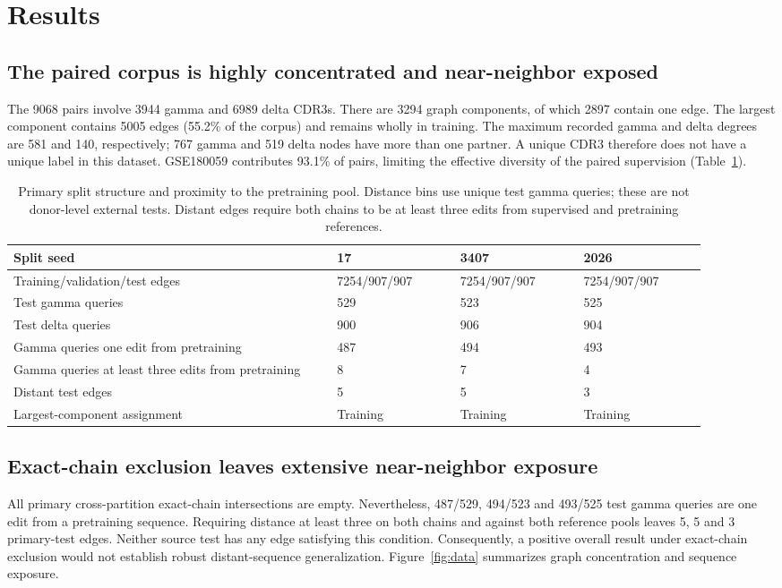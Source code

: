 \documentclass[12pt]{article}
\begin{document}
\section{Results}
\subsection{The paired corpus is highly concentrated and near-neighbor exposed}
The 9068 pairs involve 3944 gamma and 6989 delta CDR3s. There are 3294 graph
components, of which 2897 contain one edge. The largest component contains
5005 edges (55.2\% of the corpus) and remains wholly in training. The maximum
recorded gamma and delta degrees are 581 and 140, respectively; 767 gamma and
519 delta nodes have more than one partner. A unique CDR3 therefore does not
have a unique label in this dataset. GSE180059 contributes 93.1\% of pairs,
limiting the effective diversity of the paired supervision
(Table~\ref{tab:data}).

\begin{table}[!htbp]
\centering
\caption{Primary split structure and proximity to the pretraining pool. Distance bins use unique test gamma queries; these are not donor-level external tests. Distant edges require both chains to be at least three edits from supervised and pretraining references.}
\label{tab:data}
\small
\setlength{\tabcolsep}{3pt}
\begin{tabular}{>{\raggedright\arraybackslash}p{0.4200\linewidth}p{0.1600\linewidth}p{0.1600\linewidth}p{0.1600\linewidth}}
\toprule
Split seed & 17 & 3407 & 2026\\
\midrule
Training/validation/test edges & 7254/907/907 & 7254/907/907 & 7254/907/907\\
Test gamma queries & 529 & 523 & 525\\
Test delta queries & 900 & 906 & 904\\
Gamma queries one edit from pretraining & 487 & 494 & 493\\
Gamma queries at least three edits from pretraining & 8 & 7 & 4\\
Distant test edges & 5 & 5 & 3\\
Largest-component assignment & Training & Training & Training\\
\bottomrule
\end{tabular}
\end{table}

\subsection{Exact-chain exclusion leaves extensive near-neighbor exposure}
All primary cross-partition exact-chain intersections are empty. Nevertheless,
487/529, 494/523 and 493/525 test gamma queries are one edit from a pretraining
sequence. Requiring distance at least three on both chains and against both
reference pools leaves 5, 5 and 3 primary-test edges. Neither source test has any
edge satisfying this condition. Consequently, a positive overall result under
exact-chain exclusion would not establish robust distant-sequence generalization.
Figure~\ref{fig:data} summarizes graph concentration and sequence exposure.
\end{document}
